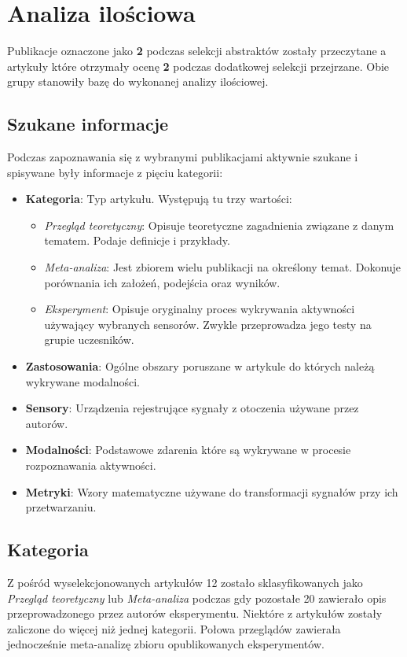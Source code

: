 \section{Analiza ilościowa}
Publikacje oznaczone jako {\bf 2} podczas selekcji abstraktów zostały przeczytane a artykuły które otrzymały ocenę {\bf 2} podczas dodatkowej selekcji przejrzane. Obie grupy stanowiły bazę do wykonanej analizy ilościowej.

\subsection{Szukane informacje}
Podczas zapoznawania się z wybranymi publikacjami aktywnie szukane i spisywane były informacje z pięciu kategorii:
\begin{itemize}
    \item {\bf Kategoria}: Typ artykułu. Występują tu trzy wartości:
    \begin{itemize}
		\item {\it Przegląd teoretyczny}: Opisuje teoretyczne zagadnienia związane z danym tematem. Podaje definicje i przykłady.
		\item {\it Meta-analiza}: Jest zbiorem wielu publikacji na określony temat. Dokonuje porównania ich założeń, podejścia oraz wyników.
		\item {\it Eksperyment}: Opisuje oryginalny proces wykrywania aktywności używający wybranych sensorów. Zwykle przeprowadza jego testy na grupie uczesników.
	\end{itemize}
    \item {\bf Zastosowania}: Ogólne obszary poruszane w artykule do których należą wykrywane modalności.
    \item {\bf Sensory}: Urządzenia rejestrujące sygnały z otoczenia używane przez autorów.
    \item {\bf Modalności}: Podstawowe zdarenia które są wykrywane w procesie rozpoznawania aktywności.
    \item {\bf Metryki}: Wzory matematyczne używane do transformacji sygnałów przy ich przetwarzaniu.
\end{itemize}

\subsection{Kategoria}
Z pośród wyselekcjonowanych artykułów 12 zostało sklasyfikowanych jako \textit{Przegląd teoretyczny} lub \textit{Meta-analiza} podczas gdy pozostałe 20 zawierało opis przeprowadzonego przez autorów eksperymentu. Niektóre z artykułów zostały zaliczone do więcej niż jednej kategorii. Połowa przeglądów zawierała jednocześnie meta-analizę zbioru opublikowanych eksperymentów.



